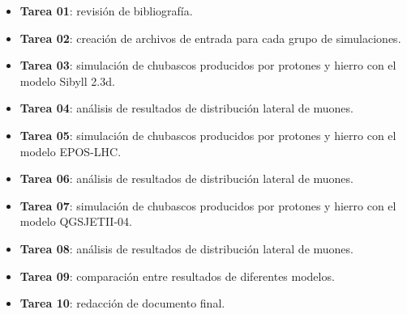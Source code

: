 \begin{itemize}
\item \textbf{Tarea 01}: revisión de bibliografía.
	
\item \textbf{Tarea 02}: creación de archivos de entrada para cada grupo de simulaciones.

\item \textbf{Tarea 03}: simulación de chubascos producidos por protones y hierro con el modelo Sibyll 2.3d.

\item \textbf{Tarea 04}: análisis de resultados de distribuci\'on lateral de muones.

\item \textbf{Tarea 05}: simulación de chubascos producidos por protones y hierro con el modelo EPOS-LHC.

\item \textbf{Tarea 06}: análisis de resultados de distribuci\'on lateral de muones.

\item \textbf{Tarea 07}: simulación de chubascos producidos por protones y hierro con el modelo QGSJETII-04.

\item \textbf{Tarea 08}: análisis de resultados de distribuci\'on lateral de muones.

\item \textbf{Tarea 09}: comparación entre resultados de diferentes modelos.

\item \textbf{Tarea 10}: redacción de documento final.
\end{itemize}



